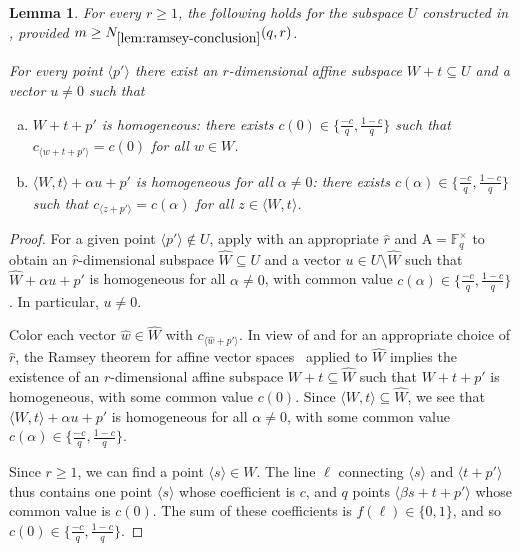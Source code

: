 \documentclass{article}
\newtheorem{lemma}[theorem]{Lemma}
\theoremstyle{definition}
\providecommand{\FF}{\mathbb{F}}
\providecommand{\Nramseyc}{N_{\ref{lem:ramsey-conclusion}}}
\providecommand{\Alpha}{\mathrm{A}}
\begin{document}
\begin{lemma} \label{lem:ramsey-conclusion}
For every $r \ge 1$, the following holds for the subspace $U$ constructed in , provided $m \ge \Nramseyc(q,r)$.

For every point $\langle p' \rangle$ there exist an $r$-dimensional affine subspace $W + t \subseteq U$ and a vector $u \neq 0$ such that
\begin{enumerate}[(a)]
\item $W + t + p'$ is homogeneous: there exists $c(0) \in \{\frac{-c}{q},\frac{1-c}{q}\}$ such that $c_{\langle w + t + p' \rangle} = c(0)$ for all $w \in W$.
\item $\langle W,t \rangle + \alpha u + p'$ is homogeneous for all $\alpha \neq 0$: there exists $c(\alpha) \in \{\frac{-c}{q},\frac{1-c}{q}\}$ such that $c_{\langle z + p' \rangle} = c(\alpha)$ for all $z \in \langle W,t \rangle$.
\end{enumerate}
\end{lemma}
\begin{proof}
For a given point $\langle p' \rangle \notin U$, apply  with an appropriate $\hat r$ and $\Alpha = \FF_q^\times$ to obtain an $\hat r$-dimensional subspace $\hat W \subseteq U$ and a vector $u \in U \setminus \hat W$ such that $\hat W + \alpha u + p'$ is homogeneous for all $\alpha \neq 0$, with common value $c(\alpha) \in \{\frac{-c}{q}, \frac{1-c}{q}\}$. In particular, $u \neq 0$.

Color each vector $\hat w \in \hat W$ with $c_{\langle \hat w + p' \rangle}$. In view of  and for an appropriate choice of $\hat r$, the Ramsey theorem for affine vector spaces~\cite{GLR72} applied to $\hat W$ implies the existence of an $r$-dimensional affine subspace $W + t \subseteq \hat W$ such that $W + t + p'$ is homogeneous, with some common value $c(0)$. Since $\langle W,t \rangle \subseteq \hat W$, we see that $\langle W,t \rangle + \alpha u + p'$ is homogeneous for all $\alpha \neq 0$, with some common value $c(\alpha) \in \{\frac{-c}{q}, \frac{1-c}{q}\}$.

Since $r \ge 1$, we can find a point $\langle s \rangle \in W$. The line $\ell$ connecting $\langle s \rangle$ and $\langle t + p' \rangle$ thus contains one point $\langle s \rangle$ whose coefficient is $c$, and $q$ points $\langle \beta s + t + p' \rangle$ whose common value is $c(0)$. The sum of these coefficients is $f(\ell) \in \{0,1\}$, and so $c(0) \in \{\frac{-c}{q}, \frac{1-c}{q}\}$.
\end{proof}
\end{document}
